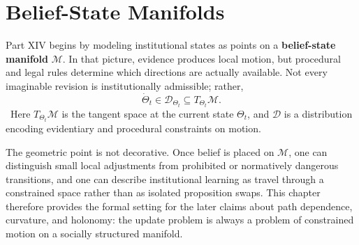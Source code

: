 
\chapter{Belief-State Manifolds}
\label{ch:ch077}

Part XIV begins by modeling institutional states as points on a \textbf{belief-state manifold} \(\mathcal M\). In that picture, evidence produces local motion, but procedural and legal rules determine which directions are actually available. Not every imaginable revision is institutionally admissible; rather,
\[
\dot\Theta_t\in\mathcal D_{\Theta_t}\subseteq T_{\Theta_t}\mathcal M.
\]
\Definition\ Here \(T_{\Theta_t}\mathcal M\) is the tangent space at the current state \(\Theta_t\), and \(\mathcal D\) is a distribution encoding evidentiary and procedural constraints on motion.

The geometric point is not decorative. Once belief is placed on \(\mathcal M\), one can distinguish small local adjustments from prohibited or normatively dangerous transitions, and one can describe institutional learning as travel through a constrained space rather than as isolated proposition swaps. This chapter therefore provides the formal setting for the later claims about path dependence, curvature, and holonomy: the update problem is always a problem of constrained motion on a socially structured manifold.
